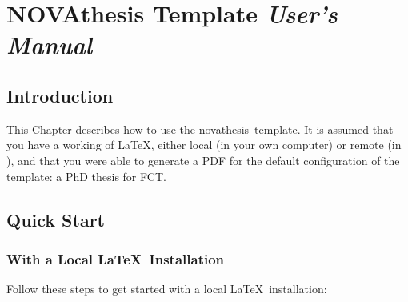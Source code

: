 
%

\chapter{NOVAthesis Template \emph{User's Manual}}
\label{cha:users_manual}

\glsresetall

\begin{center}
\end{center}


\section{Introduction}
\label{sec:introduction}

This Chapter describes how to use the \gls{novathesis}\ template.  It is assumed that you have a working  of \LaTeX, either local (in your own computer) or remote (in \Overleaf), and that you were able to generate a PDF for the default configuration of the template: a PhD thesis for \gls{FCT}.


\section{Quick Start}
\label{sec:quick_started}

\subsection{With a Local \LaTeX\ Installation} %
\label{sub:with_a_local_latex_installation}

Follow these steps to get started with a local \LaTeX\ installation:

